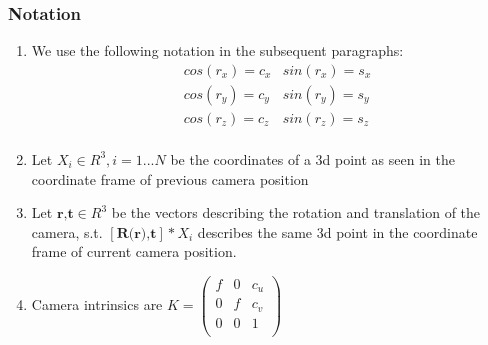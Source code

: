 \documentclass[10pt]{article}         %
\begin{document}
\subsubsection{Notation}
\begin{enumerate}

\item We use the following notation in the subsequent paragraphs: \begin{align*}
&cos(r_x)=c_x&sin(r_x)=s_x\\
&cos(r_y)=c_y&sin(r_y)=s_y\\
&cos(r_z)=c_z&sin(r_z)=s_z\\
\end{align*}

\item Let $X_i\in R^3,i=1...N$ be the coordinates of a 3d point as seen in the coordinate frame of previous camera position

\item Let $\textbf{r,t}\in R^3$ be the vectors describing the rotation and translation of the camera, s.t. $[\textbf{R(r),t}]*X_i$ describes the same 3d point in the coordinate frame of current camera position.

\item Camera intrinsics are $K=\left( \begin{array}{ccc} f& 0& c_u\\ 0& f& c_v\\0& 0& 1\\ \end{array}\right)$


\end{enumerate}
\end{document}
